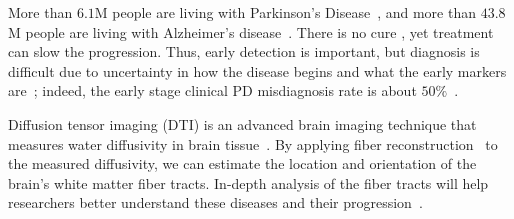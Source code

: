 %
%

\noindent More than $6.1$M people are living with Parkinson's Disease~\cite{rocca2018burden}, and more than $43.8$M people are living with Alzheimer’s disease~\cite{nichols2019global}.
There is no
cure
\cite{heemels2016neurodegenerative}, yet treatment can slow the progression. Thus, early detection is important, 
but diagnosis is
difficult due to uncertainty in how the disease begins and what the early markers are~\cite{poewe2017parkinson}; indeed, the early stage clinical PD misdiagnosis rate is about $50\%$~\cite{mollenhauer2017depressed}.


Diffusion tensor imaging (DTI) is an advanced brain imaging technique that 
measures water diffusivity in %
brain tissue~\cite{basser2002diffusion}. By applying fiber reconstruction~\cite{SMITH20121924} to the measured diffusivity, we can estimate the location and orientation of the brain's white matter fiber tracts. %
In-depth analysis of the fiber tracts will help researchers better understand these diseases and their progression~\cite{zheng2014dti}. 


